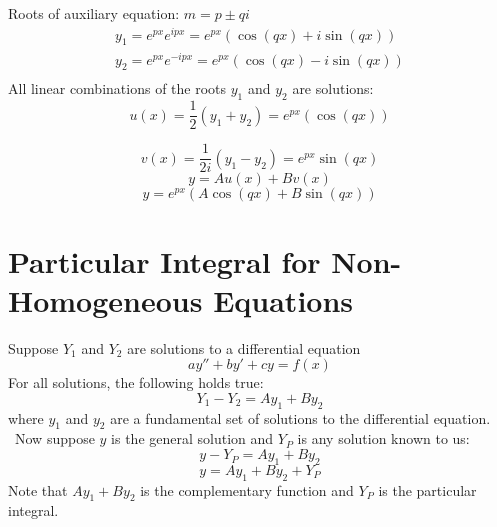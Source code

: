 \documentclass{article}
\begin{document}
Roots of auxiliary equation: $m=p\pm qi$
\begin{equation}
\begin{split}
y_1=e^{px}e^{ipx}=e^{px}(\cos(qx)+i\sin(qx)) \\
y_2=e^{px}e^{-ipx}=e^{px}(\cos(qx)-i\sin(qx)) \\
\end{split}
\end{equation}
All linear combinations of the roots $y_1$ and $y_2$ are solutions: 
\begin{equation}
    u(x)=\frac12 (y_1+y_2)=e^{px}(\cos(qx))
\end{equation}

\begin{equation}
    v(x)=\frac{1}{2i}(y_1-y_2)=e^{px}\sin(qx)
\end{equation}
$$y=Au(x)+Bv(x)$$
\begin{equation}
    y=e^{px}\left( A\cos(qx)+B\sin(qx) \right)
\end{equation}

\section{Particular Integral for Non-Homogeneous Equations}

Suppose $Y_1$ and $Y_2$ are solutions to a differential equation
$$ay''+by'+cy=f(x)$$
For all solutions, the following holds true: 
$$Y_1-Y_2=Ay_1+By_2$$
where $y_1$ and $y_2$ are a fundamental set of solutions to the differential equation. 
\
Now suppose $y$ is the general solution and $Y_P$ is any solution known to us: 
$$y-Y_P = Ay_1+By_2$$
\begin{equation}
    y = Ay_1+By_2 + Y_P
\end{equation}
Note that $Ay_1+By_2$ is the complementary function and $Y_P$ is the particular integral. 
\end{document}

